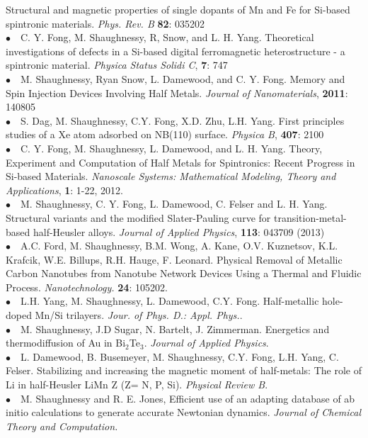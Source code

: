 \documentclass[11pt, a4paper]{article}
\newcommand{\years}[1]{\marginnote{\scriptsize #1}}
\begin{document}
{{Structural and magnetic properties of single dopants of Mn and Fe for Si-based spintronic materials.} \emph{Phys. Rev. B} \textbf{82}: 035202 \\
\years{    }$\bullet$\ \   C. Y. Fong, M. Shaughnessy, R, Snow, and L. H. Yang. %
{Theoretical investigations of defects in a Si-based digital ferromagnetic heterostructure - a spintronic material.} \emph{Physica Status Solidi C}, \textbf{7}: 747\\
\years{2011}$\bullet$\ \   M. Shaughnessy, Ryan Snow, L. Damewood, and C. Y. Fong. %
{Memory and Spin Injection Devices Involving Half Metals.} \emph{Journal of Nanomaterials}, \textbf{2011}: 140805\\
\years{2012}$\bullet$\ \   S. Dag, M. Shaughnessy, C.Y. Fong, X.D. Zhu, L.H. Yang. %
{First principles studies of a Xe atom adsorbed on NB(110) surface.} \emph{Physica B}, \textbf{407}: 2100 \\
\years{    }$\bullet$\ \   C. Y. Fong, M. Shaughnessy, L. Damewood, and L. H. Yang. %
{Theory, Experiment and Computation of Half Metals for Spintronics: Recent Progress in Si-based Materials.} \emph{Nanoscale Systems: Mathematical Modeling, Theory and Applications},  \textbf{1}: 1-22,  2012. \\
\years{2013}$\bullet$\ \   M. Shaughnessy, C. Y. Fong, L. Damewood, C. Felser and L. H. Yang. %
{Structural variants and the modified Slater-Pauling curve for transition-metal-based half-Heusler alloys.} \emph{Journal of Applied Physics}, \textbf{113}: 043709 (2013) \\
\years{    } $\bullet$\ \   A.C. Ford, M. Shaughnessy, B.M. Wong, A. Kane, O.V. Kuznetsov, K.L. Krafcik, W.E. Billups, R.H. Hauge, F. Leonard. %
{Physical Removal of Metallic Carbon Nanotubes from Nanotube Network Devices Using a Thermal and Fluidic Process.} \emph{Nanotechnology.} \textbf{24}: 105202. \\
\years{    }$\bullet$\ \    L.H. Yang, M. Shaughnessy, L. Damewood, C.Y. Fong. %
{Half-metallic hole-doped Mn/Si trilayers.} 
\emph{Jour. of Phys. D.: Appl. Phys.}. \\
\years{2014}$\bullet$\ \   M. Shaughnessy, J.D Sugar, N. Bartelt, J. Zimmerman. {Energetics and thermodiffusion of Au in Bi$_2$Te$_3$.} \emph{Journal of Applied Physics}.\\
\years{2015}$\bullet$\ \  L. Damewood, B. Busemeyer, M. Shaughnessy, C.Y. Fong, L.H. Yang, C. Felser. {Stabilizing and increasing the magnetic moment of half-metals: The role of Li in half-Heusler LiMn Z (Z= N, P, Si)}. \emph{Physical Review B}. \\
\years{    } $\bullet$\ \  M. Shaughnessy and R. E. Jones, {Efficient use of an adapting database of ab initio calculations to generate accurate Newtonian dynamics}.  \emph{Journal of Chemical Theory and Computation.} 

}
\end{document}
